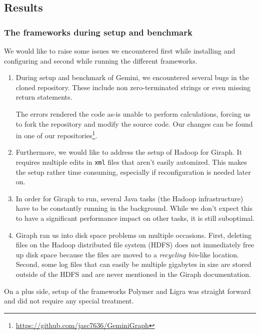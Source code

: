 
\subsection{Results}



\subsubsection{The frameworks during setup and benchmark}
We would like to raise some issues we encountered first while installing and configuring and second while running the different frameworks.

\begin{enumerate}
	\item During setup and benchmark of Gemini, we encountered several bugs in the cloned repository. These include non zero-terminated strings or even missing return statements.

	The errors rendered the code as-is unable to perform calculations, forcing us to fork the repository and modify the source code. Our changes can be found in one of our repositories\footnote{\url{https://github.com/jasc7636/GeminiGraph}}.

	\item Furthermore, we would like to address the setup of Hadoop for Giraph. It requires multiple edits in \texttt{xml} files that aren't easily automized. This makes the setup rather time consuming, especially if reconfiguration is needed later on.
	\item In order for Giraph to run, several Java tasks (the Hadoop infrastructure) have to be constantly running in the background. While we don't expect this to have a significant performance impact on other tasks, it is still suboptimal.
	\item Giraph ran us into disk space problems on multiple occasions. First, deleting files on the Hadoop distributed file system (HDFS) does not immediately free up disk space because the files are moved to a \emph{recycling bin}-like location. Second, some log files that can easily be multiple gigabytes in size are stored outside of the HDFS and are never mentioned in the Giraph documentation.
\end{enumerate}


On a plus side, setup of the frameworks Polymer and Ligra was straight forward and did not require any special treatment.





